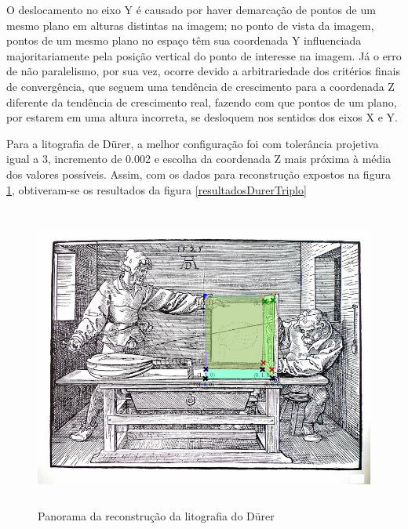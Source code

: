			O deslocamento no eixo Y é causado por haver demarcação de pontos de um mesmo plano em alturas distintas na imagem; no ponto de vista da imagem, pontos de um mesmo plano no espaço têm sua coordenada Y influenciada majoritariamente pela posição vertical do ponto de interesse na imagem. Já o erro de não paralelismo, por sua vez, ocorre devido a arbitrariedade dos critérios finais de convergência, que seguem uma tendência de crescimento para a coordenada Z diferente da tendência de crescimento real, fazendo com que pontos de um plano, por estarem em uma altura incorreta, se desloquem nos sentidos dos eixos X e Y.
			
			Para a litografia de Dürer, a melhor configuração foi com tolerância projetiva igual a 3, incremento de 0.002 e escolha da coordenada Z mais próxima à média dos valores possíveis. Assim, com os dados para reconstrução expostos na figura \ref{printTesteDurer}, obtiveram-se os resultados da figura \ref{resultadosDurerTriplo}
			
			\begin{figure}[!htb]
				\centering
				\includegraphics[height=10cm]{imagens/printTesteDurer.png}
				\caption{Panorama da reconstrução da litografia do Dürer}
				\label{printTesteDurer}
			\end{figure}
			

